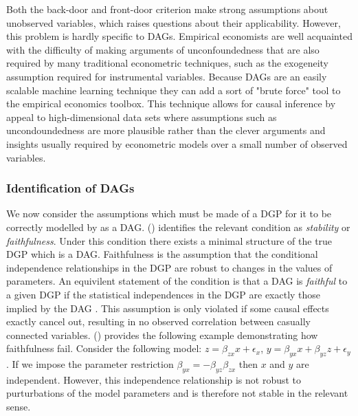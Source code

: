 \documentclass{article}
\begin{document}
Both the back-door and front-door criterion make strong assumptions about unobserved variables, which raises questions about their applicability. However, this problem is hardly specific to DAGs. Empirical economists are well acquainted with the difficulty of making arguments of unconfoundedness that are also required by many traditional econometric techniques, such as the exogeneity assumption required for instrumental variables. Because DAGs are an easily scalable machine learning technique they can add a sort of "brute force" tool to the empirical economics toolbox. This technique allows for causal inference by appeal to high-dimensional data sets where assumptions such as uncondoundedness are more plausible rather than the clever arguments and insights usually required by econometric models over a small number of observed variables.

\subsubsection{Identification of DAGs} \label{stability}

We now consider the assumptions which must be made of a DGP for it to be correctly modelled by as a DAG. \citeauthor{pearl2009causality} (\citeyear{pearl2009causality}) identifies the relevant condition as \textit{stability} or \textit{faithfulness}. Under this condition there exists a minimal structure of the true DGP which is a DAG. Faithfulness is the assumption that the conditional independence relationships in the DGP are robust to changes in the values of parameters. An equivilent statement of the condition is that a DAG is \textit{faithful} to a given DGP if the statistical independences in the DGP are exactly those implied by the DAG \parencite{spirtes2000causation}. This assumption is only violated if some causal effects exactly cancel out, resulting in no observed correlation between casually connected variables. \citeauthor{pearl2009causality} (\citeyear{pearl2009causality}) provides the following example demonstrating how faithfulness fail. Consider the following model: $z = \beta_{zx} x + \epsilon_x$, $ y = \beta_{yx} x + \beta_{yz} z + \epsilon_y$. If we impose the parameter restriction $\beta_{yx} = -\beta_{yz}\beta_{zx}$ then $x$ and $y$ are independent. However, this independence relationship is not robust to purturbations of the model parameters and is therefore not stable in the relevant sense. 
\end{document}
